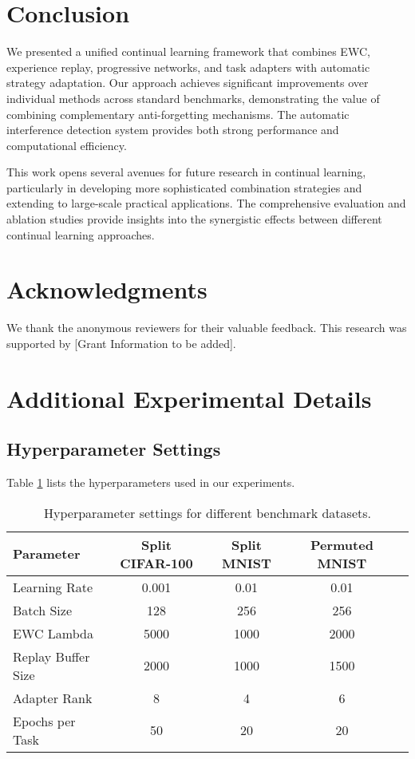 \documentclass{article}
\begin{document}
\section{Conclusion}

We presented a unified continual learning framework that combines EWC, experience replay, progressive networks, and task adapters with automatic strategy adaptation. Our approach achieves significant improvements over individual methods across standard benchmarks, demonstrating the value of combining complementary anti-forgetting mechanisms. The automatic interference detection system provides both strong performance and computational efficiency.

This work opens several avenues for future research in continual learning, particularly in developing more sophisticated combination strategies and extending to large-scale practical applications. The comprehensive evaluation and ablation studies provide insights into the synergistic effects between different continual learning approaches.

\section*{Acknowledgments}

We thank the anonymous reviewers for their valuable feedback. This research was supported by [Grant Information to be added].




\appendix

\section{Additional Experimental Details}

\subsection{Hyperparameter Settings}

Table \ref{tab:hyperparams} lists the hyperparameters used in our experiments.

\begin{table}[ht]
\centering
\caption{Hyperparameter settings for different benchmark datasets.}
\label{tab:hyperparams}
\begin{tabular}{lcccc}
\toprule
Parameter & Split CIFAR-100 & Split MNIST & Permuted MNIST \\
\midrule
Learning Rate & 0.001 & 0.01 & 0.01 \\
Batch Size & 128 & 256 & 256 \\
EWC Lambda & 5000 & 1000 & 2000 \\
Replay Buffer Size & 2000 & 1000 & 1500 \\
Adapter Rank & 8 & 4 & 6 \\
Epochs per Task & 50 & 20 & 20 \\
\bottomrule
\end{tabular}
\end{table}
\end{document}
